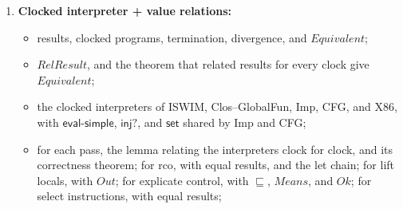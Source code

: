 \documentclass[10pt]{article}
\theoremstyle{acmplain}
\newcommand{\key}[1]{\mathsf{#1}}
\newcommand{\pass}[1]{\mathit{#1}}
\begin{document}
\begin{enumerate}
\begin{itemize}
    registers, and its transitions, with $\key{callq}$, $\key{retq}$, and jumps;
  \item forward simulations, $\mathit{Equivalent}$, and the theorem that a
    forward simulation gives $\mathit{Equivalent}$;
  \item for each pass, the relations $\approx$, $\approx_k$, and $\sim$ on
    values, continuations, and states, and its correctness theorem;
  \item for rco, $\preceq$ on environments, the pending let chain
    $\mathit{Pend}$, and its frames;
  \item for lift locals, frames related to environments ($\approx^n_\varphi$), and
    continuations given such a frame (head, weakened, and calls);
  \item for explicate control, the modes, $\preceq$, the relations $\approx$,
    $\mathit{Ctl}$, and $\mathit{Br}$ on continuations, the states indexed by
    $\mathit{depth}$, and the join lemma;
  \item for select instructions, $\approx$ between continuations and call
    stacks, $\mathit{Dest}$, the synchronisation points $\sim$, and the
    scripts $\mathit{Fate}$;
  \item the end-to-end theorems, for $\pass{compile}$, $\pass{compile\text{-}mon}$,
    $\pass{compile\text{-}imp}$, $\pass{compile\text{-}cfg}$, and $\pass{compile\text{-}x86}$;
  \item backward simulations, and the direct backward simulation for delay.
  \end{itemize}
\item \textbf{Clocked interpreter + value relations:}
  \begin{itemize}
  \item results, clocked programs, termination, divergence, and $\mathit{Equivalent}$;
  \item $\mathit{RelResult}$, and the theorem that related results for every
    clock give $\mathit{Equivalent}$;
  \item the clocked interpreters of ISWIM, Clos--GlobalFun, Imp, CFG, and X86, with
    $\key{eval\text{-}simple}$, $\key{inj?}$, and $\key{set}$ shared by Imp and CFG;
  \item for each pass, the lemma relating the interpreters clock for clock,
    and its correctness theorem; for rco, with equal results, and the let chain;
    for lift locals, with $\mathit{Out}$; for explicate control, with $\sqsubseteq$,
    $\mathit{Means}$, and $\mathit{Ok}$; for select instructions, with equal results;

\end{itemize}
\end{enumerate}
\end{document}
